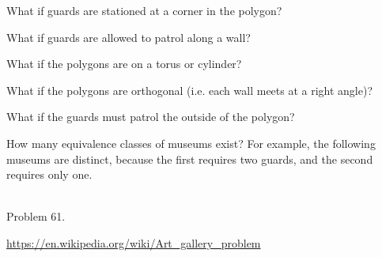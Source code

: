 \documentclass{article}
\begin{document}
\begin{related}
  \item What if guards are stationed at a corner in the polygon?
  \item What if guards are allowed to patrol along a wall?
  \item What if the polygons are on a torus or cylinder?
  \item What if the polygons are orthogonal (i.e. each wall meets at a right angle)?
  \item What if the guards must patrol the outside of the polygon?
  \item How many equivalence classes of museums exist? For example, the
  following museums are distinct, because the first requires two guards, and
  the second requires only one.\\~\\
  \hspace{0.5cm}
\end{related}
\begin{references}
  \item Problem 61.
  \item \url{https://en.wikipedia.org/wiki/Art_gallery_problem}
\end{references}
\end{document}
